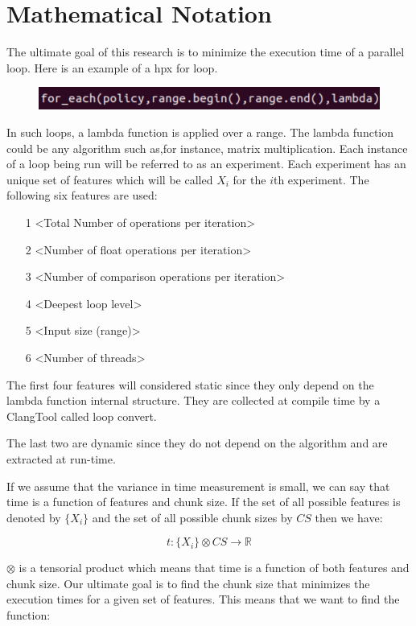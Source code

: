 \section{Mathematical Notation}
The ultimate goal of this research is to minimize the execution time of a parallel loop. Here is an example of a hpx for loop. 

\begin{figure}[h]
	\centering
	\includegraphics[scale=0.8]{images/for_each_call.pdf}
\end{figure}

In such loops, a lambda function is applied over a range. The lambda function could be any algorithm such as,for instance, matrix multiplication. Each instance of a loop being run will be referred to as an experiment. Each experiment has an unique set of features which will be called $X_i$ for the $i$th experiment. The following six features are used:

\begin{itemize}
	\item[1] <Total Number of operations per iteration>
	\item[2] <Number of float operations per iteration>
	\item[3] <Number of comparison operations per iteration>
	\item[4] <Deepest loop level>
	\item[5] <Input size (range)>
	\item[6] <Number of threads>
\end{itemize}

The first four features will considered static since they only depend on the lambda function internal structure. They are collected at compile time by a ClangTool called loop convert.

The last two are dynamic since they do not depend on the algorithm and are extracted at run-time.

If we assume that the variance in time measurement is small, we can say that time is a function of features and chunk size. If the set of all possible features is denoted by $\{X_i\}$ and the set of all possible chunk sizes by $CS$ then we have:

$$t:\{X_i\} \otimes CS \rightarrow \mathbb{R}$$

$\otimes$ is a tensorial product which means that time is a function of both features and chunk size.
Our ultimate goal is to find the chunk size that minimizes the execution times for a given set of features. This means that we want to find the function:

